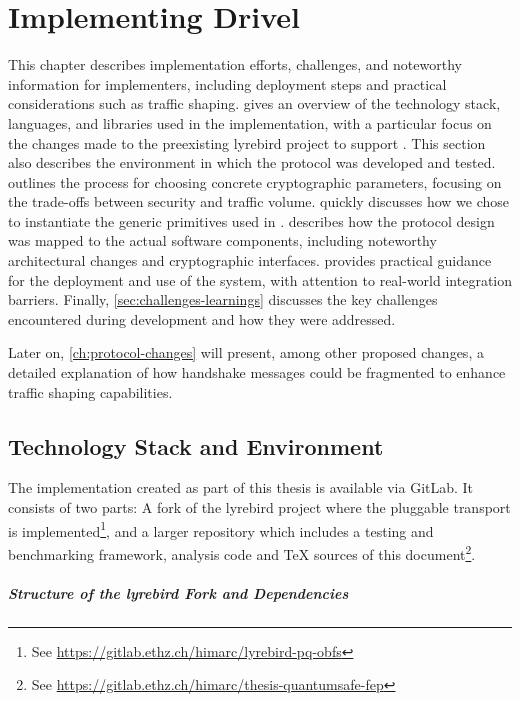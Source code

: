 \chapter{Implementing Drivel}\label{ch:implementation}

This chapter describes implementation efforts, challenges, and noteworthy information for implementers, including deployment steps and practical considerations such as traffic shaping.
 gives an overview of the technology stack, languages, and libraries used in the implementation, with a particular focus on the changes made to the preexisting lyrebird project \cite{lyrebird} to support \drivel{}. This section also describes the environment in which the protocol was developed and tested.
 outlines the process for choosing concrete cryptographic parameters, focusing on the trade-offs between security and traffic volume.
 quickly discusses how we chose to instantiate the generic primitives used in \drivel{}.
 describes how the protocol design was mapped to the actual software components, including noteworthy architectural changes and cryptographic interfaces.
 provides practical guidance for the deployment and use of the system, with attention to real-world integration barriers.
Finally, \cref{sec:challenges-learnings} discusses the key challenges encountered during development and how they were addressed.

Later on, \cref{ch:protocol-changes} will present, among other proposed changes, a detailed explanation of how handshake messages could be fragmented to enhance traffic shaping capabilities.

\section{Technology Stack and Environment} \label{sec:tech-stack}

The implementation created as part of this thesis is available via GitLab. It consists of two parts: A fork of the lyrebird project \cite{lyrebird} where the \drivel{} pluggable transport is implemented\footnote{See \url{https://gitlab.ethz.ch/himarc/lyrebird-pq-obfs}}, and a larger repository which includes a testing and benchmarking framework, analysis code and TeX sources of this document\footnote{See \url{https://gitlab.ethz.ch/himarc/thesis-quantumsafe-fep}}.

\paragraph{Structure of the lyrebird Fork and Dependencies}

